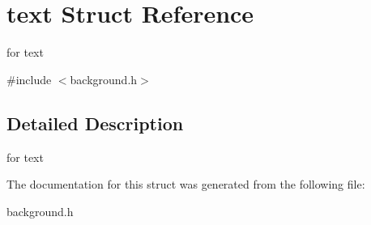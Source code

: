 \hypertarget{structtext}{}\section{text Struct Reference}
\label{structtext}


for text  




{\ttfamily \#include $<$background.\+h$>$}



\subsection{Detailed Description}
for text 

The documentation for this struct was generated from the following file\+:\begin{DoxyCompactItemize}
\item 
background.\+h\end{DoxyCompactItemize}
